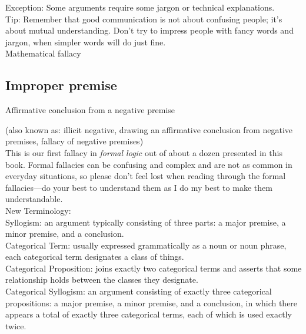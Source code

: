 \documentclass[a4paper,12pt,single,pdftex]{scrartcl}
\begin{document}
    
      Exception: Some arguments require some jargon or technical explanations.
    \\

    
      Tip: Remember that good communication is not about confusing people; it’s about mutual understanding.  Don’t try to impress people with fancy words and jargon, when simpler words will do just fine.
    \\

  

Mathematical fallacy\subsection{Improper premise}


Affirmative conclusion from a negative premise
    
      (also known as: illicit negative, drawing an affirmative conclusion from negative premises, fallacy of negative premises)
    \\

  
    
      This is our first fallacy in {\it formal logic} out of about a dozen presented in this book.  Formal fallacies can be confusing and complex and are not as common in everyday situations, so please don’t feel lost when reading through the formal fallacies—do your best to understand them as I do my best to make them understandable.
    \\

    
      New Terminology:
    \\

    
      Syllogism: an argument typically consisting of three parts: a major premise, a minor premise, and a conclusion.
    \\

    
      Categorical Term: usually expressed grammatically as a noun or noun phrase, each categorical term designates a class of things.
    \\

    
      Categorical Proposition: joins exactly two categorical terms and asserts that some relationship holds between the classes they designate.
    \\

    
      Categorical Syllogism: an argument consisting of exactly three categorical propositions: a major premise, a minor premise, and a conclusion, in which there appears a total of exactly three categorical terms, each of which is used exactly twice.
    \\
\end{document}
